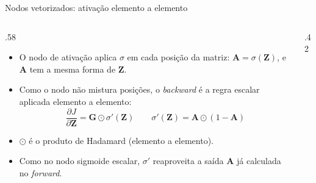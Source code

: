\documentclass[aspectratio=169,xcolor=dvipsnames]{beamer}
\begin{document}
  \begin{frame}{Nodos vetorizados: ativação elemento a elemento}
    \begin{columns}
      \begin{column}{.58\linewidth}
        \begin{itemize}
          \item O nodo de ativação aplica $\sigma$ em cada posição da
            matriz: $\mathbf{A} = \sigma(\mathbf{Z})$, e $\mathbf{A}$ tem a mesma forma de $\mathbf{Z}$.
          \item Como o nodo não mistura posições, o \textit{backward}
            é a regra escalar aplicada elemento a elemento:
            \[
              \frac{\partial J}{\partial \mathbf{Z}} = \mathbf{G} \odot \sigma'(\mathbf{Z})
              \qquad
              \sigma'(\mathbf{Z}) = \mathbf{A} \odot (1 - \mathbf{A})
            \]
          \item $\odot$ é o produto de Hadamard (elemento a elemento).
          \item Como no nodo sigmoide escalar, $\sigma'$ reaproveita a
            saída $\mathbf{A}$ já calculada no \textit{forward}.
        \end{itemize}
      \end{column}
      \begin{column}{.42\linewidth}
        \centering
      \end{column}
    \end{columns}
  \end{frame}
\end{document}
